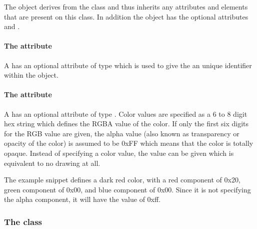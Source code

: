 The \ColorDefinition object derives from the \SBase class and thus
inherits any attributes and elements that are present on this class.
In addition the \ColorDefinition object has the optional attributes  and .

\paragraph{The \fixttspace{} attribute}

A \ColorDefinition has an optional attribute  of type
 which is used to give the \ColorDefinition an unique identifier within the \RenderInformation object.

\paragraph{The \fixttspace{} attribute}

A \ColorDefinition has an optional attribute  of type
. Color values are specified as a 6 to 8 digit hex string which 
defines the RGBA value of the color. If only the first six digits for the RGB value 
are given, the alpha value (also known as transparency or opacity of the color) 
is assumed to be 0xFF which means that the color is totally opaque. Instead of 
specifying a color value, the value  can be given which is equivalent to 
no drawing at all.

The example snippet defines a dark red color, with a red component of 0x20, green 
component of 0x00, and blue component of 0x00. Since it is not specifying the alpha 
component, it will have the value of 0xff. 

{\footnotesize
{}
}


\subsubsection{The  class}
\label{gradientbase-class}

